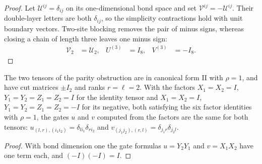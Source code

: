 \begin{proof}\leanok
    Let $\mathcal U^{ij}=\delta_{ij}$ on its one-dimensional bond space and
    set $\mathcal V^{ij}=-\mathcal U^{ij}$. Their double-layer letters are
    both $\delta_{ij}$, so the simplicity contractions hold with unit
    boundary vectors. Two-site blocking removes the pair of minus signs,
    whereas closing a chain of length three leaves one minus sign:
    \begin{align}
        \mathcal V_2 & =\mathcal U_2, &
        U^{(3)}      & =I_8,          & V^{(3)} & =-I_8.
    \end{align}
\end{proof}
\begin{lemma}
    \label{thm:mpu_parity_gates_coincide}
    \leanok
    The two tensors of the parity obstruction are in canonical form II with
    $\rho=1$, and have cut matrices $\pm I_2$ and ranks $r=\ell=2$. With the factors $X_1=X_2=I$, $Y_1=Y_2=Z_1=Z_2=I$ for the identity
    tensor and $X_1=X_2=I$, $Y_1=Y_2=Z_1=Z_2=-I$ for its negative, both satisfying the
    six factor identities with $\rho=1$, the gates $u$ and $v$ computed from the
    factors are the same for both tensors: $u_{(l,r),(i_1i_2)}=\delta_{li_1}\delta_{ri_2}$
    and $v_{(j_1j_2),(r,l)}=\delta_{j_1r}\delta_{j_2l}$.
\end{lemma}

\begin{proof}\leanok
    With bond dimension one the gate formulas $u=Y_2Y_1$ and $v=X_1X_2$ have one
    term each, and $(-I)(-I)=I$.
\end{proof}

